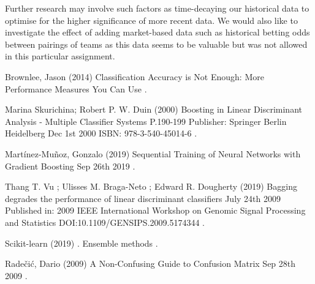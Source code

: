 \documentclass{article}
\begin{document}
Further research may involve such factors as time-decaying our historical data to optimise for the higher significance of more recent data. We would also like to investigate the effect of adding market-based data such as historical betting odds between pairings of teams as this data seems to be valuable but was not allowed in this particular assignment. 



  


\begin{thebibliography}{1}


Brownlee, Jason
\newblock (2014)
\newblock Classification Accuracy is Not Enough: More Performance Measures You Can Use
.

Marina Skurichina; Robert P. W. Duin
\newblock (2000)
\newblock Boosting in Linear Discriminant Analysis - Multiple Classifier Systems
\newblock P.190-199
\newblock Publisher: Springer Berlin Heidelberg
\newblock Dec 1st 2000
\newblock ISBN: 978-3-540-45014-6
.

Martínez-Muñoz, Gonzalo
\newblock (2019)
\newblock Sequential Training of Neural Networks with Gradient Boosting
\newblock Sep 26th  2019
.

Thang T. Vu ; Ulisses M. Braga-Neto ; Edward R. Dougherty
\newblock (2019)
\newblock Bagging degrades the performance of linear discriminant classifiers
\newblock July 24th 2009
\newblock Published in: 2009 IEEE International Workshop on Genomic Signal Processing and Statistics
\newblock DOI:10.1109/GENSIPS.2009.5174344
.

Scikit-learn
\newblock (2019)
. Ensemble methods
.

Radečić, Dario 
\newblock (2009)
\newblock A Non-Confusing Guide to Confusion Matrix
\newblock Sep 28th 2009
.
 


\end{thebibliography}
\end{document}
